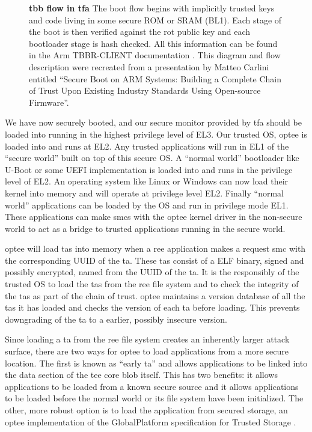 \begin{figure}[hp]
\centering

\caption[Arm Trusted Firmware Trusted Board Boot]{\textbf{\gls{tbb} flow in \gls{tfa}} The boot flow begins with implicitly trusted keys and code living in some secure ROM or SRAM (BL1). Each stage of the boot is then verified against the \gls{rot} public key and each bootloader stage is hash checked. All this information can be found in the Arm TBBR-CLIENT documentation \cite{ArmTrustedBoot}. This diagram and flow description were recreated from a presentation by Matteo Carlini entitled ``Secure Boot on ARM Systems: Building a Complete Chain of Trust Upon Existing Industry Standards Using Open-source Firmware''.}
\label{fig:tz-measure}
\end{figure}

We have now securely booted, and our secure monitor provided by \gls{tfa} should be loaded into \blto running in the highest privilege level of EL3. Our trusted OS, \gls{optee} is loaded into \blttw and runs at EL2. Any trusted applications will run in EL1 of the ``secure world'' built on top of this secure OS. A ``normal world'' bootloader like U-Boot or some UEFI implementation is loaded into \bltt and runs in the privilege level of EL2. An operating system like Linux or Windows can now load their kernel into memory and will operate at privilege level EL2.  Finally ``normal world'' applications can be loaded by the OS and run in privilege mode EL1. These applications can make \glspl{smc} with the \gls{optee} kernel driver in the non-secure world to act as a bridge to trusted applications running in the secure world.

\gls{optee} will load \glspl{ta} into memory when a \gls{ree} application makes a request \gls{smc} with the corresponding UUID of the \gls{ta}. These \glspl{ta} consist of a ELF binary, signed and possibly encrypted, named from the UUID of the \gls{ta}. It is the responsibly of the trusted OS to load the \glspl{ta} from the \gls{ree} file system and to check the integrity of the \glspl{ta} as part of the \gls{chain of trust}. \gls{optee} maintains a version database of all the \glspl{ta} it has loaded and checks the version of each \gls{ta} before loading. This prevents downgrading of the \gls{ta} to a earlier, possibly insecure version.

Since loading a \gls{ta} from the \gls{ree} file system creates an inherently larger attack surface, there are two ways for \gls{optee} to load applications from a more secure location. The first is known as ``early \gls{ta}'' and allows applications to be linked into the data section of the \gls{tee} core blob itself. This has two benefits: it allows applications to be loaded from a known secure source and it allows applications to be loaded before the normal world or its file system have been initialized. The other, more robust option is to load the application from secured storage, an \gls{optee} implementation of the GlobalPlatform specification for Trusted Storage \cite{GlobalPlatform2018}. 

